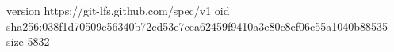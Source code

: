 version https://git-lfs.github.com/spec/v1
oid sha256:038f1d70509e56340b72cd53e7cea62459f9410a3e80c8ef06c55a1040b88535
size 5832
